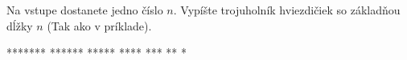 




Na vstupe dostanete jedno číslo $n$. Vypíšte trojuholník hviezdičiek so základňou dĺžky $n$ (Tak ako v príklade).

\vystup
*******
******
*****
****
***
**
*
\koniec


